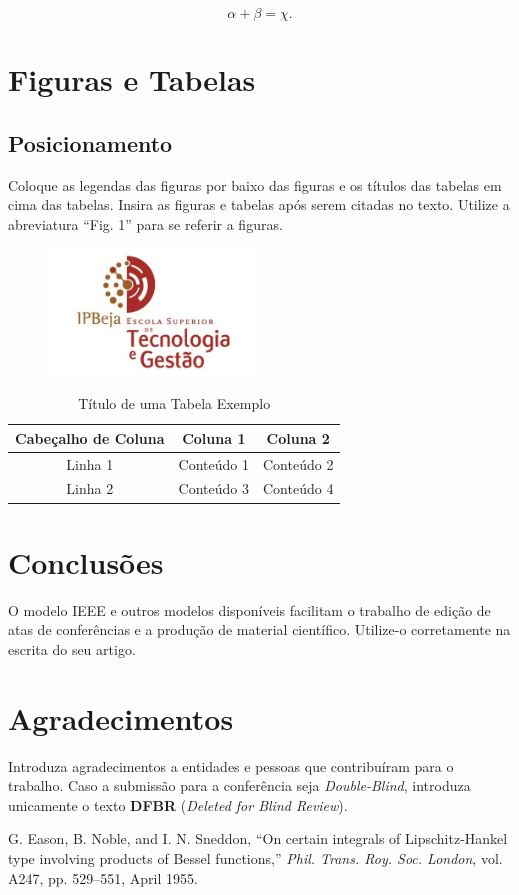 \documentclass[conference]{IEEEtran}
\begin{document}
\begin{equation}
\alpha + \beta = \chi.
\end{equation}

\section{Figuras e Tabelas}
\subsection{Posicionamento}
Coloque as legendas das figuras por baixo das figuras e os títulos das tabelas em cima das tabelas. Insira as figuras e 
tabelas após serem citadas no texto. Utilize a abreviatura “Fig. 1” para se referir a figuras.

\begin{figure}[h!]
    \centering
    \includegraphics[width=0.5\textwidth]{Resources/Logo/IPBejaESTIG.jpg}
\end{figure}
\newpage
\begin{table}[h!]
\caption{Título de uma Tabela Exemplo}
\centering
\begin{tabular}{|c|c|c|}
\hline
Cabeçalho de Coluna & Coluna 1 & Coluna 2 \\
\hline
Linha 1 & Conteúdo 1 & Conteúdo 2 \\
\hline
Linha 2 & Conteúdo 3 & Conteúdo 4 \\
\hline
\end{tabular}
\end{table}

\section{Conclusões}
O modelo IEEE e outros modelos disponíveis facilitam o trabalho de edição de atas de conferências e a produção de material 
científico. Utilize-o corretamente na escrita do seu artigo.

\section*{Agradecimentos}
Introduza agradecimentos a entidades e pessoas que contribuíram para o trabalho. Caso a submissão para a conferência seja 
\textit{Double-Blind}, introduza unicamente o texto \textbf{DFBR} (\textit{Deleted for Blind Review}).

\begin{thebibliography}{1}
 G. Eason, B. Noble, and I. N. Sneddon, “On certain integrals of Lipschitz-Hankel type involving products 
of Bessel functions,” \textit{Phil. Trans. Roy. Soc. London}, vol. A247, pp. 529–551, April 1955.
\end{thebibliography}
\end{document}
